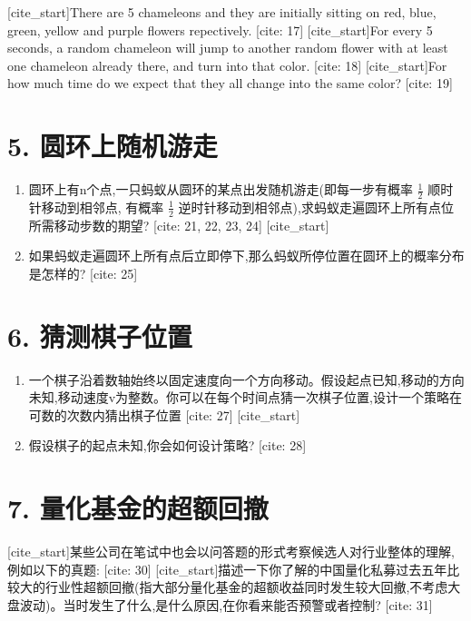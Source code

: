 \documentclass[UTF8]{ctexart}
\begin{document}
[cite_start]There are 5 chameleons and they are initially sitting on red, blue, green, yellow and purple flowers repectively. [cite: 17] [cite_start]For every 5 seconds, a random chameleon will jump to another random flower with at least one chameleon already there, and turn into that color. [cite: 18] [cite_start]For how much time do we expect that they all change into the same color? [cite: 19]

\section*{5. 圆环上随机游走}

\begin{enumerate}
    \item 圆环上有n个点,一只蚂蚁从圆环的某点出发随机游走(即每一步有概率 $\frac{1}{2}$ 顺时针移动到相邻点, 有概率 $\frac{1}{2}$ 逆时针移动到相邻点),求蚂蚁走遍圆环上所有点位所需移动步数的期望? [cite: 21, 22, 23, 24]
    [cite_start]\item 如果蚂蚁走遍圆环上所有点后立即停下,那么蚂蚁所停位置在圆环上的概率分布是怎样的? [cite: 25]
\end{enumerate}

\section*{6. 猜测棋子位置}

\begin{enumerate}
    \item 一个棋子沿着数轴始终以固定速度向一个方向移动。假设起点已知,移动的方向未知,移动速度v为整数。你可以在每个时间点猜一次棋子位置,设计一个策略在可数的次数内猜出棋子位置 [cite: 27]
    [cite_start]\item 假设棋子的起点未知,你会如何设计策略? [cite: 28]
\end{enumerate}

\section*{7. 量化基金的超额回撤}

[cite_start]某些公司在笔试中也会以问答题的形式考察候选人对行业整体的理解,例如以下的真题: [cite: 30]
[cite_start]描述一下你了解的中国量化私募过去五年比较大的行业性超额回撤(指大部分量化基金的超额收益同时发生较大回撤,不考虑大盘波动)。当时发生了什么,是什么原因,在你看来能否预警或者控制? [cite: 31]
\end{document}

